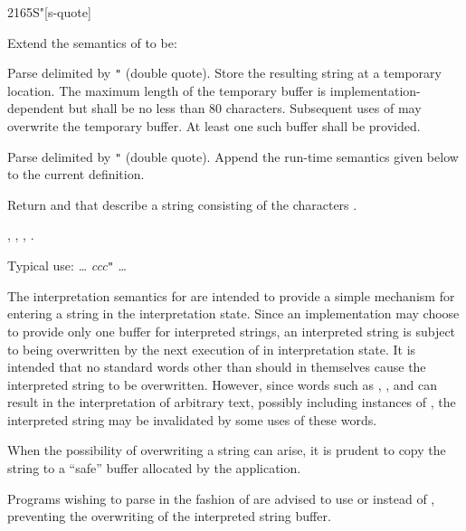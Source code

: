 \begin{worddef}[Sq]{2165}{S"}[s-quote]
\item Extend the semantics of  to be:

\interpret

	Parse  delimited by \texttt{"} (double quote). Store
	the resulting string  at a temporary location.
	The maximum length of the temporary buffer is
	implementation-dependent but shall be no less than 80 characters.
	Subsequent uses of  may overwrite the temporary buffer.
	At least one such buffer shall be provided.

\compile

	Parse  delimited by \texttt{"} (double quote). Append
	the run-time semantics given below to the current definition.

\runtime

	Return  and  that describe a string
	consisting of the characters .

\see {},
	,
	,
	.

	\begin{defer}
	\rationale %
		Typical use:
			{\ldots}  \emph{ccc}\texttt{"} {\ldots}

		The interpretation semantics for  are intended to
		provide a simple mechanism for entering a string in the
		interpretation state. Since an implementation may choose to
		provide only one buffer for interpreted strings, an
		interpreted string is subject to being overwritten by the
		next execution of  in interpretation state. It is
		intended that no standard words other than  should
		in themselves cause the interpreted string to be overwritten.
		However, since words such as ,
		,  and
		 can result in the interpretation of arbitrary
		text, possibly including instances of , the
		interpreted string may be invalidated by some uses of these
		words.

		When the possibility of overwriting a string can arise, it is
		prudent to copy the string to a ``safe'' buffer allocated by
		the application.

		Programs wishing to parse in the fashion of  are
		advised to use  or 
		 instead of , preventing the
		overwriting of the interpreted string buffer.
	\end{defer}
\end{worddef}


